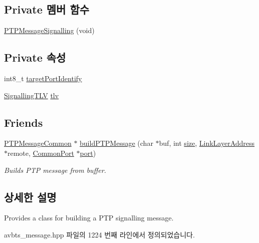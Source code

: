\subsection*{Private 멤버 함수}
\begin{DoxyCompactItemize}
\item 
\hyperlink{class_p_t_p_message_signalling_aa92187590c176d35d5deecc9e763b777}{P\+T\+P\+Message\+Signalling} (void)
\end{DoxyCompactItemize}
\subsection*{Private 속성}
\begin{DoxyCompactItemize}
\item 
int8\+\_\+t \hyperlink{class_p_t_p_message_signalling_a1d4353212906ed7366ffbf01cb56bdab}{target\+Port\+Identify}
\item 
\hyperlink{class_signalling_t_l_v}{Signalling\+T\+LV} \hyperlink{class_p_t_p_message_signalling_ab458dc952682abd8077ce12fbff3d1d6}{tlv}
\end{DoxyCompactItemize}
\subsection*{Friends}
\begin{DoxyCompactItemize}
\item 
\hyperlink{class_p_t_p_message_common}{P\+T\+P\+Message\+Common} $\ast$ \hyperlink{class_p_t_p_message_signalling_a3f587ce328a50a9f7af19f9822579d0d}{build\+P\+T\+P\+Message} (char $\ast$buf, int \hyperlink{gst__avb__playbin_8c_a439227feff9d7f55384e8780cfc2eb82}{size}, \hyperlink{class_link_layer_address}{Link\+Layer\+Address} $\ast$remote, \hyperlink{class_common_port}{Common\+Port} $\ast$\hyperlink{gst__avb__playbin_8c_a63c89c04d1feae07ca35558055155ffb}{port})
\begin{DoxyCompactList}\small\item\em Builds P\+TP message from buffer. \end{DoxyCompactList}\end{DoxyCompactItemize}


\subsection{상세한 설명}
Provides a class for building a P\+TP signalling message. 

avbts\+\_\+message.\+hpp 파일의 1224 번째 라인에서 정의되었습니다.



